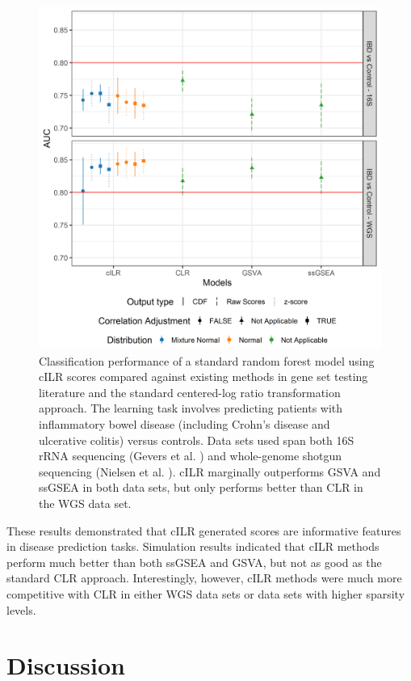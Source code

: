 \documentclass{article}
\begin{document}
\begin{figure}[H]
    \centering
    \includegraphics[scale = 0.6]{figures/data_prediction_plot.png}
    \caption{Classification performance of a standard random forest model using cILR scores compared against existing methods in gene set testing literature and the standard centered-log ratio transformation approach. The learning task involves predicting patients with inflammatory bowel disease (including Crohn's disease and ulcerative colitis) versus controls. Data sets used span both 16S rRNA sequencing (Gevers et al. \cite{gevers2014}) and whole-genome shotgun sequencing (Nielsen et al. \cite{nielsen2014}). cILR marginally outperforms GSVA and ssGSEA in both data sets, but only performs better than CLR in the WGS data set.}
    \label{fig:pred_data}
\end{figure}

These results demonstrated that cILR generated scores are informative features in disease prediction tasks. Simulation results indicated that cILR methods perform much better than both ssGSEA and GSVA, but not as good as the standard CLR approach. Interestingly, however, cILR methods were much more competitive with CLR in either WGS data sets or data sets with higher sparsity levels. 


\section*{Discussion}
\end{document}
